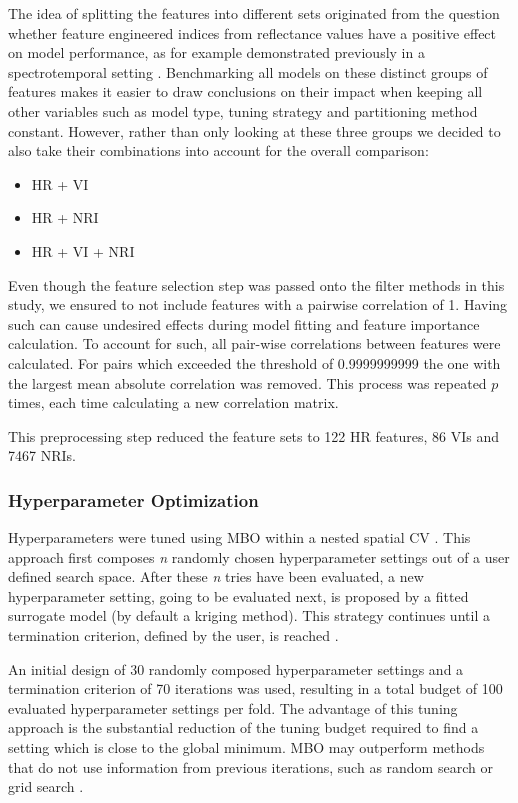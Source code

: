 \documentclass[letterpaper, peerreview, draftcls]{IEEEtran}
\begin{document}
The idea of splitting the features into different sets originated from the question whether feature engineered indices from reflectance values have a positive effect on model performance, as for example demonstrated previously in a spectrotemporal setting \cite{pena2017}.
Benchmarking all models on these distinct groups of features makes it easier to draw conclusions on their impact when keeping all other variables such as model type, tuning strategy and partitioning method constant.
However, rather than only looking at these three groups we decided to also take their combinations into account for the overall comparison:

\begin{itemize}
	\item HR + VI %
	\item HR + NRI
	\item HR + VI + NRI
\end{itemize}

Even though the feature selection step was passed onto the filter methods in this study, we ensured to not include features with a pairwise correlation of 1.
Having such can cause undesired effects during model fitting and feature importance calculation.
To account for such, all pair-wise correlations between features were calculated.
For pairs which exceeded the threshold of 0.9999999999 the one with the largest mean absolute correlation was removed.
This process was repeated $p$ times, each time calculating a new correlation matrix.

This preprocessing step reduced the feature sets to 122 HR features, 86 VIs and 7467 NRIs.

\subsubsection{Hyperparameter Optimization}

\noindent Hyperparameters were tuned using \ac{MBO} within a nested spatial CV \cite{mlrmbo, schratz2019}.
This approach first composes \textit{n} randomly chosen hyperparameter settings out of a user defined search space.
After these \textit{n} tries have been evaluated, a new hyperparameter setting, going to be evaluated next, is proposed by a fitted surrogate model (by default a kriging method).
This strategy continues until a termination criterion, defined by the user, is reached \cite{hutter2011, jones1998}.

An initial design of 30 randomly composed hyperparameter settings and a termination criterion of 70 iterations was used, resulting in a total budget of 100 evaluated hyperparameter settings per fold.
The advantage of this tuning approach is the substantial reduction of the tuning budget required to find a setting which is close to the global minimum.
\ac{MBO} may outperform methods that do not use information from previous iterations, such as random search or grid search \cite{bergstra2012}.
\end{document}
